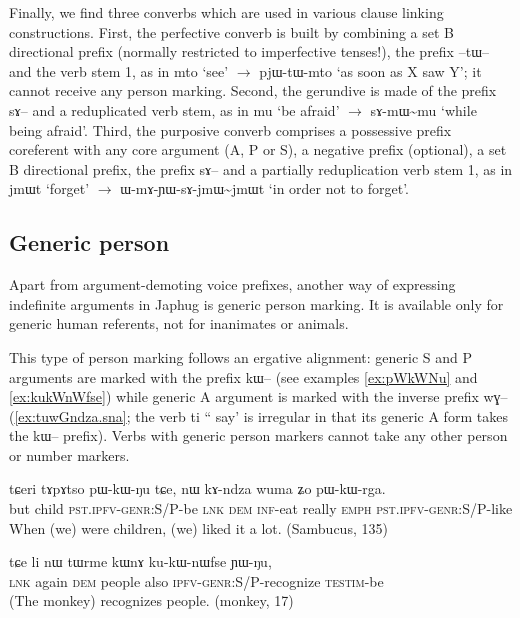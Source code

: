 \documentclass[oldfontcommands,oneside,a4paper,11pt]{article}
\newcommand{\ipa}[1]{{\phon #1}} %
\begin{document}
Finally, we find three converbs which are used in various clause linking constructions. First, the perfective converb is built by combining a set B directional prefix (normally restricted to imperfective tenses!),  the prefix \ipa{--tɯ--} and the verb stem 1, as in \ipa{mto} `see' $\rightarrow$ \ipa{pjɯ-tɯ-mto} `as soon as X saw Y'; it cannot receive any person marking. Second, the gerundive is made of the prefix \ipa{sɤ--} and a reduplicated verb stem, as in \ipa{mu} `be afraid' $\rightarrow$ \ipa{sɤ-mɯ\textasciitilde{}mu} `while being afraid'. Third, the purposive converb comprises a possessive prefix coreferent with any core argument (A, P or S), a negative prefix (optional), a set B directional prefix, the prefix \ipa{sɤ--} and a partially reduplication verb stem 1, as in \ipa{jmɯt} `forget' $\rightarrow$ \ipa{ɯ-mɤ-ɲɯ-sɤ-jmɯ\textasciitilde{}jmɯt} `in order not to forget'.

\subsection{Generic person}
Apart from argument-demoting voice prefixes, another way of expressing indefinite arguments in Japhug is generic person marking. It is available only for generic human referents, not for inanimates or animals.

This type of person marking follows an ergative alignment: generic S and P arguments are marked with the prefix \ipa{kɯ--} (see examples \ref{ex:pWkWNu} and \ref{ex:kukWnWfse}) while generic A argument is marked with the inverse prefix \ipa{wɣ--} (\ref{ex:tuwGndza.sna}; the verb \ipa{ti} `` say' is irregular in that its generic A form takes the \ipa{kɯ--} prefix).  Verbs with generic person markers cannot take any other person or number markers.


\begin{exe}
\ex \label{ex:pWkWNu}
\gll
\ipa{tɕeri} 	\ipa{tɤpɤtso} 	\ipa{pɯ-kɯ-ŋu} 	\ipa{tɕe,} 	\ipa{nɯ} 	\ipa{kɤ-ndza} 	\ipa{wuma} 	\ipa{ʑo} 	\ipa{pɯ-kɯ-rga.} \\
but child \textsc{pst.ipfv-genr}:S/P-be \textsc{lnk} \textsc{dem} \textsc{inf}-eat really \textsc{emph} \textsc{pst.ipfv-genr}:S/P-like \\
\glt When (we) were children, (we) liked it a lot. (Sambucus, 135)
\end{exe}


\begin{exe}
\ex \label{ex:kukWnWfse}
\gll
\ipa{tɕe}  	\ipa{li}  	\ipa{nɯ}  	\ipa{tɯrme}  	\ipa{kɯnɤ}  	\ipa{ku-kɯ-nɯfse}  	\ipa{ɲɯ-ŋu,}\\
\textsc{lnk} again \textsc{dem} people also \textsc{ipfv-genr:S/P}-recognize \textsc{testim}-be\\
\glt  (The monkey) recognizes people. (monkey, 17)
\end{exe}
\end{document}

